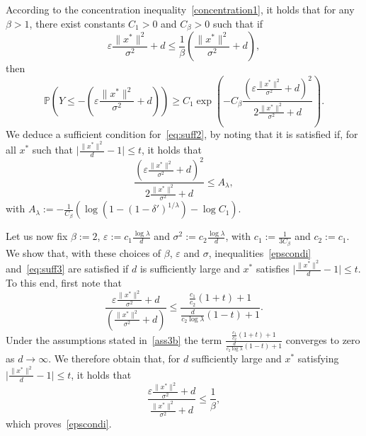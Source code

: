 \begin{subappendices}
\begin{prv*}
According to the concentration inequality~\ref{concentration1}, it holds that for any $\beta>1$, there exist constants $C_1>0$ and $C_\beta>0$ such that if 
\begin{equation}
\label{epscondi}
    \varepsilon\frac{\lVert x^*\rVert^2}{\sigma^2}+d \leq \frac1\beta \left(\frac{\lVert x^*\rVert^2}{\sigma^2}+d\right),
\end{equation}
then 
$$\mathbb{P}\left(Y\leq -\left(\varepsilon\frac{\lVert x^*\rVert^2}{\sigma^2}+d\right)\right) \geq C_1 \exp{\left(-C_\beta \frac{(\varepsilon\frac{\lVert x^*\rVert^2}{\sigma^2}+d)^2}{2\frac{\lVert x^*\rVert^2}{\sigma^2}+d}\right)}.$$
We deduce a sufficient condition for~\eqref{eq:suff2}, by noting that it is satisfied if, for all $x^*$ such that $\lvert\frac{\lVert x^*\rVert^2}{d}-1\rvert\leq t$, it holds that
\begin{equation}
\frac{\left(\varepsilon\frac{\lVert x^*\rVert^2}{\sigma^2}+d\right)^2}{2\frac{\lVert x^*\rVert^2}{\sigma^2}+d} \leq A_\lambda,
\label{eq:suff3}
\end{equation}
with $A_\lambda := -\frac{1}{C_\beta}\left(\log\left(1-(1-\delta')^{1/\lambda}\right)-\log C_1\right)$. 

Let us now fix $\beta:=2$, $\varepsilon := c_1\frac{\log\lambda}{d}$ and $\sigma^2:=c_2\frac{\log\lambda}{d}$, with $c_1 := \frac{1}{3 C_\beta}$ and $c_2:=c_1$. 
We show that, with these choices of $\beta$, $\varepsilon$ and $\sigma$, inequalities~\eqref{epscondi} and~\ref{eq:suff3} are satisfied if $d$ is sufficiently large and $x^*$ satisfies $\lvert\frac{\lVert x^*\rVert^2}{d}-1\rvert\leq t$. 
To this end, first note that 
$$\frac{\varepsilon\frac{\lVert x^*\rVert^2}{\sigma^2}+d}{ (\frac{\lVert x^*\rVert^2}{\sigma^2}+d)}\leq  \frac{\frac{c_1}{c_2}(1+t)+1}{\frac{d}{c_2\log\lambda}(1-t)+1}.$$
Under the assumptions stated in~\eqref{ass3b} the term $\frac{\frac{c_1}{c_2}(1+t)+1}{\frac{d}{c_2\log\lambda}(1-t)+1}$ converges to zero as $d\rightarrow \infty$. 
We therefore obtain that, for $d$ sufficiently large and $x^*$ satisfying $\lvert\frac{\lVert x^*\rVert^2}{d}-1\rvert\leq t$, it holds that  $$\frac{\varepsilon\frac{\lVert x^*\rVert^2}{\sigma^2}+d}{\frac{\lVert x^*\rVert^2}{\sigma^2}+d} \leq \frac1\beta,$$
which proves~\eqref{epscondi}. 


\end{prv*}
\end{subappendices}
